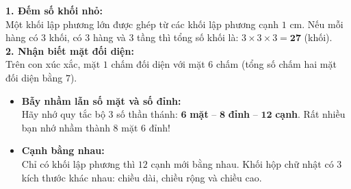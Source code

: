\documentclass[12pt,a4paper]{article}
\begin{document}
\vspace{-2.5mm}
\noindent
\begin{minipage}[t]{0.49\textwidth}\vspace{0pt}
\begin{tcolorbox}[
  enhanced,
  colback=green!4!white,
  colframe=green!60!black,
  arc=2mm, boxrule=0.8pt,
  left=2mm, right=2mm, top=1.8mm, bottom=1.8mm,
  title={\footnotesize\bfseries\color{white}\faCheckCircle\ Ví dụ thực hành chuẩn mực}
]
{\footnotesize
\textbf{1. Đếm số khối nhỏ:}\\
Một khối lập phương lớn được ghép từ các khối lập phương cạnh $1\text{ cm}$. Nếu mỗi hàng có $3$ khối, có $3$ hàng và $3$ tầng thì tổng số khối là: $3 \times 3 \times 3 = \mathbf{27}$ (khối).\\
\textbf{2. Nhận biết mặt đối diện:}\\
Trên con xúc xắc, mặt $1$ chấm đối diện với mặt $6$ chấm (tổng số chấm hai mặt đối diện bằng $7$).
}
\end{tcolorbox}
\end{minipage}
\hfill
\begin{minipage}[t]{0.49\textwidth}\vspace{0pt}
\begin{tcolorbox}[
  enhanced,
  colback=red!4!white,
  colframe=red!70!black,
  arc=2mm, boxrule=0.8pt,
  left=2mm, right=2mm, top=1.8mm, bottom=1.8mm,
  title={\footnotesize\bfseries\color{white}\faExclamationTriangle\ Mẹo tránh bẫy trắc nghiệm}
]
{\footnotesize
\begin{itemize}\setlength{\itemsep}{1.5pt}\setlength{\leftskip}{-2.5mm}
  \item \textbf{Bẫy nhầm lẫn số mặt và số đỉnh:}\\
  Hãy nhớ quy tắc bộ 3 số thần thánh: $\mathbf{6}$ \textbf{mặt} -- $\mathbf{8}$ \textbf{đỉnh} -- $\mathbf{12}$ \textbf{cạnh}. Rất nhiều bạn nhớ nhầm thành 8 mặt 6 đỉnh!
  \item \textbf{Cạnh bằng nhau:}\\
  Chỉ có khối lập phương thì $12$ cạnh mới bằng nhau. Khối hộp chữ nhật có $3$ kích thước khác nhau: chiều dài, chiều rộng và chiều cao.
\end{itemize}
}
\end{tcolorbox}
\end{minipage}
\end{document}
